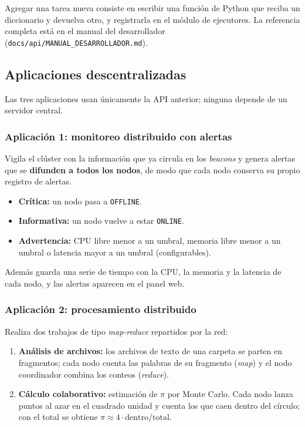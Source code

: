 Agregar una tarea nueva consiste en escribir una función de Python que reciba un diccionario y
devuelva otro, y registrarla en el módulo de ejecutores. La referencia completa está en el manual del
desarrollador (\texttt{docs/api/MANUAL\_DESARROLLADOR.md}).

\subsection{Aplicaciones descentralizadas}

Las tres aplicaciones usan únicamente la API anterior; ninguna depende de un servidor central.

\subsubsection{Aplicación 1: monitoreo distribuido con alertas}

Vigila el clúster con la información que ya circula en los \emph{beacons} y genera alertas que se
\textbf{difunden a todos los nodos}, de modo que cada nodo conserva su propio registro de alertas.

\begin{itemize}
\item \textbf{Crítica:} un nodo pasa a \texttt{OFFLINE}.
\item \textbf{Informativa:} un nodo vuelve a estar \texttt{ONLINE}.
\item \textbf{Advertencia:} CPU libre menor a un umbral, memoria libre menor a un umbral o latencia
mayor a un umbral (configurables).
\end{itemize}

Además guarda una serie de tiempo con la CPU, la memoria y la latencia de cada nodo, y las alertas
aparecen en el panel web.

\subsubsection{Aplicación 2: procesamiento distribuido}

Realiza dos trabajos de tipo \emph{map-reduce} repartidos por la red:

\begin{enumerate}
\item \textbf{Análisis de archivos:} los archivos de texto de una carpeta se parten en fragmentos; cada
nodo cuenta las palabras de su fragmento (\emph{map}) y el nodo coordinador combina los conteos
(\emph{reduce}).
\item \textbf{Cálculo colaborativo:} estimación de $\pi$ por Monte Carlo. Cada nodo lanza puntos al azar
en el cuadrado unidad y cuenta los que caen dentro del círculo; con el total se obtiene
$\pi \approx 4 \cdot \mathrm{dentro} / \mathrm{total}$.
\end{enumerate}

